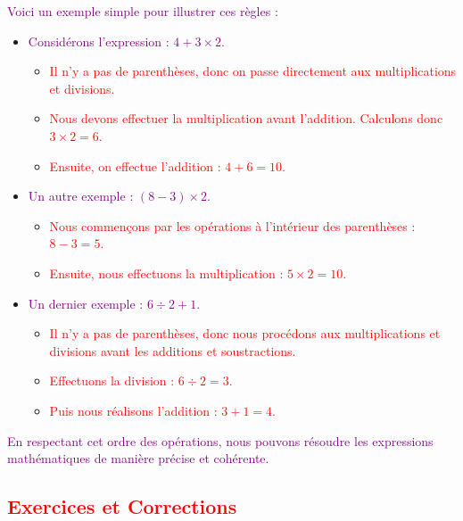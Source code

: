 \documentclass{article}
\begin{document}
\vspace{0.25cm}

\textcolor{purple}{Voici un exemple simple pour illustrer ces règles :}

\begin{itemize}
    \item \textcolor{purple}{Considérons l'expression : \( 4 + 3 \times 2 \).}
    \begin{itemize}
        \item \textcolor{red}{Il n'y a pas de parenthèses, donc on passe directement aux multiplications et divisions.}
        \item \textcolor{red}{Nous devons effectuer la multiplication avant l'addition. Calculons donc \( 3 \times 2 = 6 \).}
        \item \textcolor{red}{Ensuite, on effectue l'addition : \( 4 + 6 = 10 \).}
    \end{itemize}

    \item \textcolor{purple}{Un autre exemple : \( (8 - 3) \times 2 \).}
    \begin{itemize}
        \item \textcolor{red}{Nous commençons par les opérations à l'intérieur des parenthèses : \( 8 - 3 = 5 \).}
        \item \textcolor{red}{Ensuite, nous effectuons la multiplication : \( 5 \times 2 = 10 \).}
    \end{itemize}

    \item \textcolor{purple}{Un dernier exemple : \( 6 \div 2 + 1 \).}
    \begin{itemize}
        \item \textcolor{red}{Il n'y a pas de parenthèses, donc nous procédons aux multiplications et divisions avant les additions et soustractions.}
        \item \textcolor{red}{Effectuons la division : \( 6 \div 2 = 3 \).}
        \item \textcolor{red}{Puis nous réalisons l'addition : \( 3 + 1 = 4 \).}
    \end{itemize}
\end{itemize}

\textcolor{purple}{En respectant cet ordre des opérations, nous pouvons résoudre les expressions mathématiques de manière précise et cohérente.}

\subsection{\textcolor{red}{Exercices et Corrections}}
\end{document}
